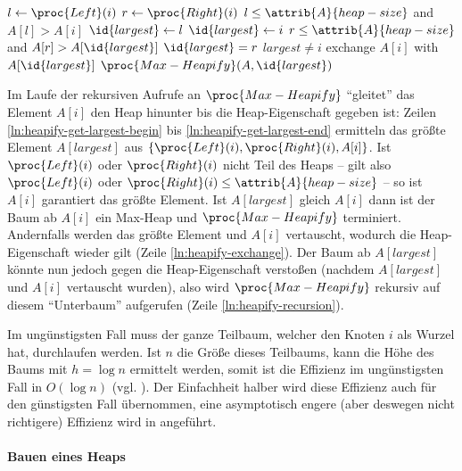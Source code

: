 \begin{codebox}
    \li $l \gets \proc{Left}(i)$\label{ln:heapify-get-largest-begin}
    \li $r \gets \proc{Right}(i)$
    \li \If $l \leq \attrib{A}{heap-size}$ and $A[l] > A[i]$
    \li      \Then
                $\id{largest} \gets l$
    \li     \Else
                $\id{largest} \gets i$
            \End
    \li \If $r \leq \attrib{A}{heap-size}$ and $A[r] > A[\id{largest}]$
    \li     \Then
                $\id{largest} = r$
            \End\label{ln:heapify-get-largest-end}
    \li \If $largest \neq i$ \label{ln:heapify-largest}
    \li     \Then
                exchange $A[i]$ with $A[\id{largest}]$\label{ln:heapify-exchange}
    \li         $\proc{Max-Heapify}(A, \id{largest})$\label{ln:heapify-recursion}
            \End
\end{codebox}

Im Laufe der rekursiven Aufrufe an $\proc{Max-Heapify}$ \enquote{gleitet} das Element $A[i]$ den Heap hinunter bis die Heap-Eigenschaft gegeben ist: Zeilen \ref{ln:heapify-get-largest-begin} bis \ref{ln:heapify-get-largest-end} ermitteln das größte Element $A[largest]$ aus $\{\proc{Left}(i), \proc{Right}(i), A[i]\}$. Ist $\proc{Left}(i)$ oder $\proc{Right}(i)$ nicht Teil des Heaps -- gilt also $\proc{Left}(i)$ oder $\proc{Right}(i) \leq \attrib{A}{heap-size}$ -- so ist $A[i]$ garantiert das größte Element. Ist $A[largest]$ gleich $A[i]$ dann ist der Baum ab $A[i]$ ein Max-Heap und $\proc{Max-Heapify}$ terminiert. Andernfalls werden das größte Element und $A[i]$ vertauscht, wodurch die Heap-Eigenschaft wieder gilt (Zeile \ref{ln:heapify-exchange}). Der Baum ab $A[largest]$ könnte nun jedoch gegen die Heap-Eigenschaft verstoßen (nachdem $A[largest]$ und $A[i]$ vertauscht wurden), also wird $\proc{Max-Heapify}$ rekursiv auf diesem \enquote{Unterbaum} aufgerufen (Zeile \ref{ln:heapify-recursion}).

Im ungünstigsten Fall muss der ganze Teilbaum, welcher den Knoten $i$ als Wurzel hat, durchlaufen werden. Ist $n$ die Größe dieses Teilbaums, kann die Höhe des Baums mit $h = \log n$ ermittelt werden, somit ist die Effizienz im ungünstigsten Fall in $O(\log n)$ (vgl. \cite[155]{clrs2001}). Der Einfachheit halber wird diese Effizienz auch für den günstigsten Fall übernommen, eine asymptotisch engere (aber deswegen nicht richtigere) Effizienz wird in \cite{bff1996} angeführt.

\paragraph{Bauen eines Heaps}

